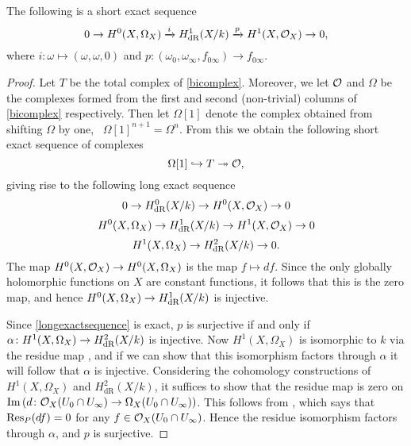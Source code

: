     \begin{prop}\label{ses}
    The following is a short exact sequence
        \begin{equation}\label{equationses}
        0 \rightarrow H^0(X,\Omega_X) \xrightarrow{i} H_{\text {dR}}^1(X/k) \xrightarrow{p} H^1(X,{\cal O}_X) \rightarrow 0, 
        \end{equation}
    where $i \colon \omega \mapsto (\omega, \omega, 0)$ and $p \colon (\omega_0, \omega_\infty, f_{0 \infty}) \to f_{0 \infty}$.
    \end{prop}
    \begin{proof}
    Let $T$ be the total complex of \eqref{bicomplex}.
    Moreover, we let ${\cal O}$ and $\Omega$ be the complexes formed from the first and second (non-trivial) columns of \eqref{bicomplex} respectively.
    Then let $\Omega[1]$ denote the complex obtained from shifting $\Omega$ by one, \ie~$\Omega[1]^{n+1} = \Omega^n$.
    From this we obtain the following short exact sequence of complexes 
        \[
        \Omega[1] \hookrightarrow T \twoheadrightarrow {\cal O},
        \]
    giving rise to the following long exact sequence
        \begin{equation*}
        0 \rightarrow H^0_{\text {dR}}(X/k) \rightarrow H^0(X,{\cal O}_X) \rightarrow 0
        \end{equation*}
        \begin{equation}\label{longexactsequence}
         H^0(X,\Omega_X) \rightarrow H_{\text {dR}}^1(X/k) \rightarrow H^1(X,\mathcal{O}_X) \rightarrow 0
        \end{equation}
        \begin{equation*}
         H^1(X,\Omega_X) \rightarrow H^2_{\text {dR}}(X/k) \rightarrow 0.
        \end{equation*}
    The map $H^0(X,{\cal O}_X) \rightarrow {H^0(X,\Omega_X)}$ is the map $f \mapsto df$.
    Since the only globally holomorphic functions on $X$ are constant functions, it follows that this is the zero map, and hence ${H^0(X,\Omega_X)} \rightarrow H_{\text {dR}}^1(X/k)$ is injective.
    
    Since \eqref{longexactsequence} is exact, $p$ is surjective if and only if $\alpha \colon H^1(X,\Omega_X) \rightarrow H^2_{\text {dR}}(X/k)$ is injective.
    Now $H^1(X,\Omega_X)$ is isomorphic to $k$ via the residue map \cite[Chap. III, Thm. 7.14.1]{hart}, and if we can show that this isomorphism factors through $\alpha$ it will follow that $\alpha$ is injective.
    Considering the \cech cohomology constructions of $H^1(X,\Omega_X)$ and $H^2_{\text {dR}}(X/k)$, it suffices to show that the residue map is zero on $\operatorname{Im} \left( d \colon {\cal O}_X(U_0 \cap U_\infty) \rightarrow \Omega_X(U_0 \cap U_\infty) \right)$.
    This follows from \cite[Chap. III, Thm. 7.14.1 (b)]{hart}, which says that $\operatorname{Res}_P(df)=0$ for any $f \in {\cal O}_X(U_0 \cap U_\infty)$.
    Hence the residue isomorphism factors through $\alpha$, and $p$ is surjective.
    \end{proof}

